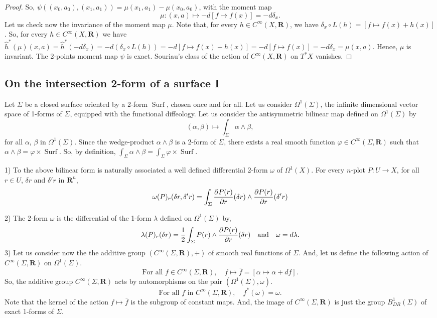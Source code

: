 \documentclass[10pt,reqno,twoside]{amsart}
\newcommand{\qmbox}[1]{\quad\mbox{#1}\quad}
\newcommand{\RR}{\mathbf{R}}
\DeclareMathOperator{\Surf}{Surf}
\newcommand{\Cinfty}{C^\infty}
\newcommand{\undemi}{\frac{1}{2}}
\newcommand{\R}{R}
\renewcommand{\L}{L}
\newcommand{\D}{D}
\newcommand{\B}{B}
\newcommand{\T}{T}
\theoremstyle{plain}
\theoremstyle{definition}
\newcommand{\article}[1]{\subsection{#1}}
\begin{document}
\begin{proof}
    So,
    $\psi((x_0,a_0),(x_1,a_1)) = \mu(x_1,a_1) - \mu(x_0,a_0)$,
    with the moment map
    $$
      \mu : (x,a) \mapsto -d[f \mapsto f(x)] = - d \delta_x.
      $$
    Let us check now the invariance of the moment map $\mu$.
    Note that,
    for every $h \in \Cinfty(X,\RR)$,
    we have $\delta_x \circ \L(h) = [f \mapsto f(x) + h(x)]$.
    So,
    for every $h \in \Cinfty(X,\RR)$ we have $\hat h^*(\mu)(x,a) = \hat h^*(-d \delta_x) = -d(\delta_x \circ \L(h)) = - d [f \mapsto f(x) + h(x)] = - d [f \mapsto f(x)] = - d \delta_x = \mu(x,a)$.
    Hence,
    $\mu$ is invariant.
    The 2-points moment map $\psi$ is exact.
    Souriau's class of the action of $\Cinfty(X,\RR)$ on $\T^*X$ vanishes.
  \end{proof}
  
  \article{On the intersection 2-form of a surface I}
  \label{On-the-intersection-form-of-a-surface-I}
  Let $\Sigma$ be a closed surface oriented by a 2-form $\Surf$,
  chosen once and for all.
  Let us consider $\Omega^1(\Sigma)$,
  the infinite dimensional vector space of 1-forms of $\Sigma$,
  equipped with the functional diffeology.
  Let us consider the antisymmetric bilinear map defined on $\Omega^1(\Sigma)$ by
  $$
    (\alpha,\beta) \mapsto \int_\Sigma \alpha\wedge \beta,
    $$
  for all $\alpha$, $\beta$ in $\Omega^1(\Sigma)$.
  Since the wedge-product $\alpha \wedge\beta$ is a 2-form of $\Sigma$,
  there exists a real smooth function $\varphi \in \Cinfty(\Sigma,\RR)$ such that $\alpha \wedge \beta = \varphi \times \Surf$.
  So,
  by definition,
  $\int_\Sigma \alpha \wedge \beta = \int_\Sigma \varphi \times \Surf$.
  
  1) To the above bilinear form is naturally associated a well defined differential 2-form $\omega$ of $\Omega^1(X)$.
  For every $n$-plot $P : U \to X$,
  for all $r \in U$, $\delta r$ and $\delta' r$ in $\RR^n$,
  $$
    \omega(P)_r(\delta r,\delta' r) = \int_\Sigma {\partial P (r) \over \partial r}(\delta r)\wedge {\partial P (r) \over \partial r}(\delta' r)
    $$
  
  2) The 2-form $\omega$ is the differential of the 1-form $\lambda$ defined on $\Omega^1(\Sigma)$ by,
  $$
    \lambda(P)_r(\delta r) = \undemi \int_\Sigma P (r)\wedge {\partial P (r) \over \partial r}(\delta r) \qmbox{and} \omega = d\lambda.
    $$
  3) Let us consider now the the additive group $(\Cinfty(\Sigma,\RR),+)$ of smooth real functions of $\Sigma$.
  And,
  let us define the following action of $\Cinfty(\Sigma,\RR)$ on $\Omega^1(\Sigma)$.
  $$
    \mbox{For all $f \in \Cinfty(\Sigma,\RR)$}, \quad f \mapsto \bar f = [\alpha \mapsto \alpha + df].
    $$
  So,
  the additive group $\Cinfty(\Sigma,\RR)$ acts by automorphisms on the pair $(\Omega^1(\Sigma),\omega)$.
  $$
    \mbox{For all $f$ in $\Cinfty(\Sigma,\RR)$}, \quad f^*(\omega) = \omega.
    $$
  Note that the kernel of the action $f \mapsto \bar f$ is the subgroup of constant maps.
  And,
  the image of $\Cinfty(\Sigma,\RR)$ is just the group $\B^1_{\D\R}(\Sigma)$ of exact 1-forms of $\Sigma$.
  
\end{document}
